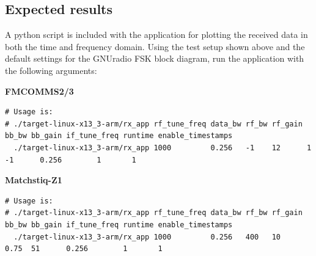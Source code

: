\pagebreak
\subsection{Expected results}
\noindent A python script is included with the application for plotting the received data in both the time and frequency domain. Using the test setup shown above and the default settings for the GNUradio FSK block diagram, run the application with the following arguments:\par\medskip

\small
\noindent\textbf{FMCOMMS2/3}
\scriptsize
\begin{verbatim}
# Usage is:
# ./target-linux-x13_3-arm/rx_app rf_tune_freq data_bw rf_bw rf_gain bb_bw bb_gain if_tune_freq runtime enable_timestamps
  ./target-linux-x13_3-arm/rx_app 1000         0.256   -1    12      1     -1      0.256        1       1
\end{verbatim}
\par\medskip
\small

\noindent\textbf{Matchstiq-Z1}
\scriptsize
\begin{verbatim}
# Usage is:
# ./target-linux-x13_3-arm/rx_app rf_tune_freq data_bw rf_bw rf_gain bb_bw bb_gain if_tune_freq runtime enable_timestamps
  ./target-linux-x13_3-arm/rx_app 1000         0.256   400   10      0.75  51      0.256        1       1
\end{verbatim}
\par\medskip
\small

